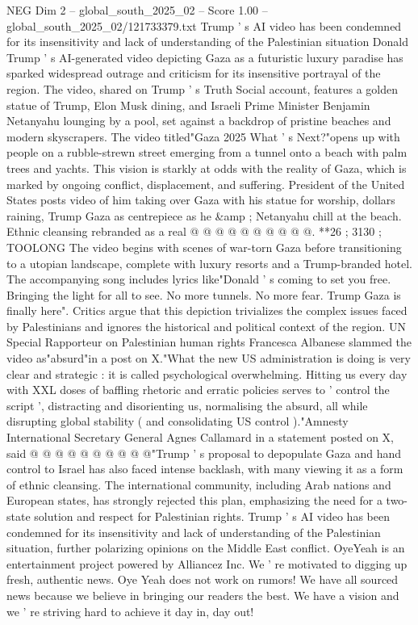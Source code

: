 \begin{textsample}{NEG Dim 2 – global\_south\_2025\_02 – Score 1.00 – global\_south\_2025\_02/121733379.txt}  \label{ex:f2_neg_067}
Trump ' s AI video has been condemned for its insensitivity and lack of understanding of the Palestinian situation Donald Trump ' s AI-generated video depicting Gaza as a futuristic luxury paradise has sparked widespread outrage and criticism for its insensitive portrayal of the region.
The video, shared on Trump ' s Truth Social account, features a golden statue of Trump, Elon Musk dining, and Israeli Prime Minister Benjamin Netanyahu lounging by a pool, set against a backdrop of pristine beaches and modern skyscrapers.
The video titled"Gaza 2025 What ' s Next?"opens up with people on a rubble-strewn street emerging from a tunnel onto a beach with palm trees and yachts.
This vision is starkly at odds with the reality of Gaza, which is marked by ongoing conflict, displacement, and suffering.
President of the United States posts video of him taking over Gaza with his statue for worship, dollars raining, Trump Gaza as centrepiece as he \&amp ; Netanyahu chill at the beach.
Ethnic cleansing rebranded as a real @ @ @ @ @ @ @ @ @ @. **26 ; 3130 ; TOOLONG The video begins with scenes of war-torn Gaza before transitioning to a utopian landscape, complete with luxury resorts and a Trump-branded hotel.
The accompanying song includes lyrics like"Donald ' s coming to set you free.
Bringing the light for all to see.
No more tunnels.
No more fear.
Trump Gaza is finally here".
Critics argue that this depiction trivializes the complex issues faced by Palestinians and ignores the historical and political context of the region.
UN Special Rapporteur on Palestinian human rights Francesca Albanese slammed the video as"absurd"in a post on X."What the new US administration is doing is very clear and strategic : it is called psychological overwhelming.
Hitting us every day with XXL doses of baffling rhetoric and erratic policies serves to ' control the script ', distracting and disorienting us, normalising the absurd, all while disrupting global stability ( and consolidating US control )."Amnesty International Secretary General Agnes Callamard in a statement posted on X, said @ @ @ @ @ @ @ @ @ @"Trump ' s proposal to depopulate Gaza and hand control to Israel has also faced intense backlash, with many viewing it as a form of ethnic cleansing.
The international community, including Arab nations and European states, has strongly rejected this plan, emphasizing the need for a two-state solution and respect for Palestinian rights.
Trump ' s AI video has been condemned for its insensitivity and lack of understanding of the Palestinian situation, further polarizing opinions on the Middle East conflict.
OyeYeah is an entertainment project powered by Alliancez Inc.
We ' re motivated to digging up fresh, authentic news.
Oye Yeah does not work on rumors!
We have all sourced news because we believe in bringing our readers the best.
We have a vision and we ' re striving hard to achieve it day in, day out!

\end{textsample}
